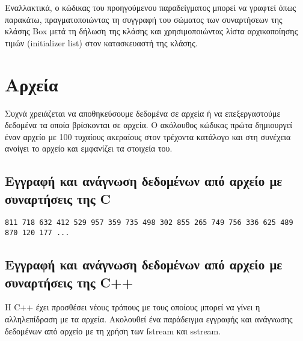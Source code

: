 



Εναλλακτικά, ο κώδικας του προηγούμενου παραδείγματος μπορεί να γραφτεί όπως παρακάτω, πραγματοποιώντας τη συγγραφή του σώματος των συναρτήσεων της κλάσης Box μετά τη δήλωση της κλάσης και χρησιμοποιώντας λίστα αρχικοποίησης τιμών (initializer list) στον κατασκευαστή της κλάσης.




\section{Αρχεία}
Συχνά χρειάζεται να αποθηκεύσουμε δεδομένα σε αρχεία ή να επεξεργαστούμε δεδομένα τα οποία βρίσκονται σε αρχεία. Ο ακόλουθος κώδικας πρώτα δημιουργεί έναν αρχείο με 100 τυχαίους ακεραίους στον τρέχοντα κατάλογο και στη συνέχεια ανοίγει το αρχείο και εμφανίζει τα στοιχεία του.

\subsection{Εγγραφή και ανάγνωση δεδομένων από αρχείο με συναρτήσεις της C}



\begin{lstlisting}[style=DOS]
811 718 632 412 529 957 359 735 498 302 855 265 749 756 336 625 489 870 120 177 ...
\end{lstlisting}

\subsection{Εγγραφή και ανάγνωση δεδομένων από αρχείο με συναρτήσεις της C++}
Η C++ έχει προσθέσει νέους τρόπους με τους οποίους μπορεί να γίνει η αλληλεπίδραση με τα αρχεία. Ακολουθεί ένα παράδειγμα εγγραφής και ανάγνωσης δεδομένων από αρχείο με τη χρήση των fstream και sstream.





